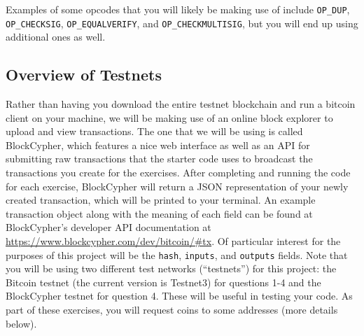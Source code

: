 \documentclass[11pt]{article}
\begin{document}
Examples of some opcodes that you will likely be making use of include \texttt{OP\_DUP}, \texttt{OP\_CHECKSIG}, \texttt{OP\_EQUALVERIFY}, and \texttt{OP\_CHECKMULTISIG}, but you will end up using additional ones as well.

\subsection{Overview of Testnets} {\label{testnets}}
Rather than having you download the entire testnet blockchain and run a bitcoin client on your machine, we will be making use of an online block explorer to upload and view transactions. The one that we will be using is called BlockCypher, which features a nice web interface as well as an API for submitting raw transactions that the starter code uses to broadcast the transactions you create for the exercises. After completing and running the code for each exercise, BlockCypher will return a JSON representation of your newly created transaction, which will be printed to your terminal. An example transaction object along with the meaning of each field can be found at BlockCypher's developer API documentation at 
\href{https://www.blockcypher.com/dev/bitcoin/\#tx}{https://www.blockcypher.com/dev/bitcoin/\#tx}.
Of particular interest for the purposes of this project will be the \texttt{hash}, \texttt{inputs}, and \texttt{outputs} fields. Note that you will be using two different test networks (``testnets'') for this project: the Bitcoin testnet (the current version is Testnet3) for questions 1-4 and the BlockCypher testnet for question 4. These will be useful in testing your code. As part of these exercises, you will request coins to some addresses (more details below).
\end{document}
